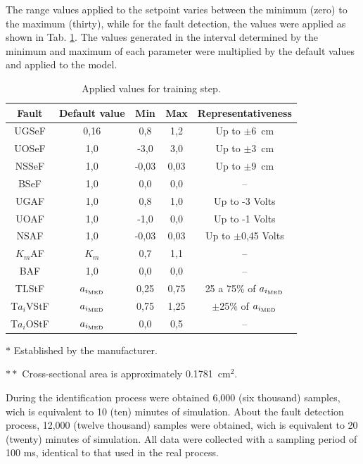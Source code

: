 \documentclass[10pt,fleqn,a4paper]{article}
\begin{document}
The range values applied to the setpoint varies between the minimum (zero) to
the maximum (thirty), while for the fault detection, the values were applied as
shown in Tab. \ref{tab:values}. The values generated in the interval determined
by the minimum and maximum of each parameter were multiplied by the default
values and applied to the model.

\begin{table}[htb]
\caption{Applied values for training step.}
\label{tab:values}
\centering
\begin{threeparttable}
\begin{tabular}{|c|c|c|c|c|}
\hline
{\bf Fault} & {\bf Default value} & {\bf Min} & {\bf Max} & 
{\bf Representativeness}\\
\hline
UGSeF & 0,16\tnote{$*$} & 
0,8 & 1,2 & Up to $\pm$6\ cm\\
\hline
UOSeF & 1,0 & -3,0 & 3,0 & Up to $\pm$3\ cm\\
\hline
NSSeF & 1,0 & -0,03 & 0,03 & Up to $\pm$9\ cm\\
\hline
BSeF & 1,0 & 0,0 & 0,0 & -- \\
\hline
UGAF & 1,0 & 0,8 & 1,0 & Up to -3 Volts\\
\hline
UOAF & 1,0 & -1,0 & 0,0 & Up to -1 Volts\\
\hline
NSAF & 1,0 & -0,03 & 0,03 & Up to $\pm$0,45 Volts\\
\hline
$K_m$AF & $K_m$ & 0,7 & 1,1 & --\\
\hline
BAF & 1,0 & 0,0 & 0,0 & --\\
\hline
TLStF & $a_{i_{\text{\tiny MED}}}$\tnote{$**$} & 
0,25 & 0,75 & 25 a 75\% of $a_{i_{\text{\tiny MED}}}$\\
\hline
T$a_i$VStF & $a_{i_{\text{\tiny MED}}}$ & 
0,75 & 1,25 & $\pm$25\% of $a_{i_{\text{\tiny MED}}}$\\
\hline
T$a_i$OStF & $a_{i_{\text{\tiny MED}}}$ & 
0,0 & 0,5 & --\\
\hline
\end{tabular}
\begin{tablenotes}
\item [$*$] Established by the manufacturer.
\item [$**$] Cross-sectional area is approximately 0.1781\ cm${}^2$.
\end{tablenotes}
\end{threeparttable}
\end{table}

During the identification process were obtained 6,000 (six thousand) samples,
wich is equivalent to 10 (ten) minutes of simulation. About the fault detection
process, 12,000 (twelve thousand) samples were obtained, wich is equivalent to
20 (twenty) minutes of simulation. All data were collected with a sampling
period of 100 ms, identical to that used in the real process.
\end{document}
